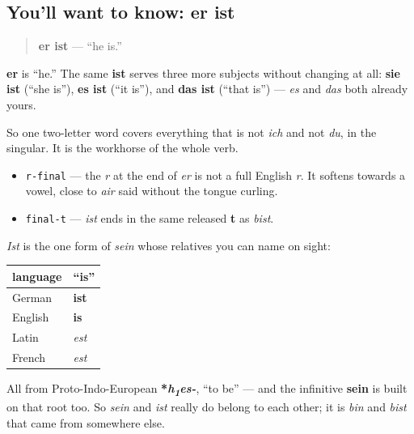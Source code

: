 \subsection*{You'll want to know: er ist}
\begin{quote}
\textbf{er ist} — \textquotedblleft{}he is.\textquotedblright{}
\end{quote}

\textbf{er} is \textquotedblleft{}he.\textquotedblright{} The same \textbf{ist} serves three more subjects without changing at all: \textbf{sie ist} (\textquotedblleft{}she is\textquotedblright{}), \textbf{es ist} (\textquotedblleft{}it is\textquotedblright{}), and \textbf{das ist} (\textquotedblleft{}that is\textquotedblright{}) — \emph{es} and \emph{das} both already yours.

So one two-letter word covers everything that is not \emph{ich} and not \emph{du}, in the singular. It is the workhorse of the whole verb.

\begin{sounds}
\begin{itemize}
\raggedright
  \item \texttt{r-final} — the \emph{r} at the end of \emph{er} is not a full English \emph{r}. It softens towards a vowel, close to \emph{air} said without the tongue curling.
  \item \texttt{final-t} — \emph{ist} ends in the same released \textbf{t} as \emph{bist}.
\end{itemize}
\end{sounds}

\begin{cousinweb}
\emph{Ist} is the one form of \emph{sein} whose relatives you can name on sight:

\noindent
\begin{tabularx}{\linewidth}{@{}>{\raggedright\arraybackslash}X>{\raggedright\arraybackslash}X@{}}
\toprule
\textbf{language} & \textbf{\textquotedblleft{}is\textquotedblright{}} \\
\midrule
German & \textbf{ist} \\
English & \textbf{is} \\
Latin & \emph{est} \\
French & \emph{est} \\
\bottomrule
\end{tabularx}

All from Proto-Indo-European \textbf{*\emph{h\textsubscript{1}es-}}, \textquotedblleft{}to be\textquotedblright{} — and the infinitive \textbf{sein} is built on that root too. So \emph{sein} and \emph{ist} really do belong to each other; it is \emph{bin} and \emph{bist} that came from somewhere else.
\end{cousinweb}

